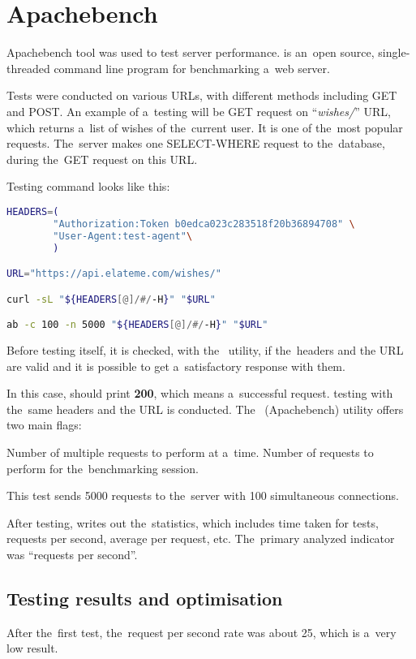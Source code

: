 \section{Apachebench}
Apachebench tool was used to test server performance.  is an~open source, single-threaded
command line program for benchmarking a~web server.

Tests were conducted on various \ac{URL}s, with different methods including GET and POST. An example of a~testing will
be GET request on ``\textit{wishes/}'' \ac{URL}, which returns a~list of wishes of the~current user. It is one of
the~most popular requests. The~server makes one SELECT-WHERE request to the~database, during the~GET request on this
\ac{URL}.

Testing command looks like this:

\begin{lstlisting}[language=bash]
HEADERS=(
        "Authorization:Token b0edca023c283518f20b36894708" \
        "User-Agent:test-agent"\
        )

URL="https://api.elateme.com/wishes/"

curl -sL "${HEADERS[@]/#/-H}" "$URL"

ab -c 100 -n 5000 "${HEADERS[@]/#/-H}" "$URL"
\end{lstlisting}
Before testing itself, it is checked, with the~ utility, if the~headers and the \ac{URL} are valid and it is
possible to get a~satisfactory response with them.

In this case,  should print \textbf{200}, which means a~successful request.  testing with the~same
headers and the \ac{URL} is conducted. The~ (Apachebench) utility offers two main flags:

\begin{itemize}
 Number of multiple requests to perform at a~time.
\flag{n} Number of requests to perform for the~benchmarking session.
\end{itemize}

This test sends 5000 requests to the~server with 100 simultaneous connections.

After testing, \bash{ab} writes out the~statistics, which includes time taken for tests, requests per second, average
per request, etc. The~primary analyzed indicator was ``requests per second''.

\subsection{Testing results and optimisation}
After the~first test, the~request per second rate was about 25, which is a~very low result.

